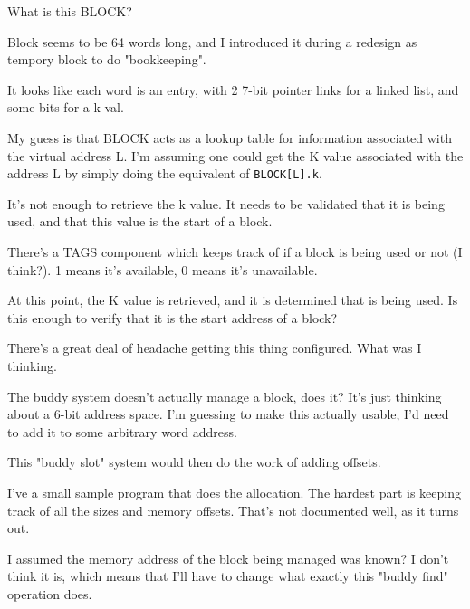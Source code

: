 What is this BLOCK?
\par

Block seems to be 64 words long, and I introduced it during a redesign as tempory block to do "bookkeeping".
\par

It looks like each word is an entry, with 2 7-bit pointer links for a linked list, and some bits for a k-val.
\par

My guess is that BLOCK acts as a lookup table for information associated with the virtual address L. I'm assuming one could get the K value associated with the address L by simply doing the equivalent of {\tt BLOCK[L].k}.
\par

It's not enough to retrieve the k value. It needs to be validated that it is being used, and that this value is the start of a block.
\par

There's a TAGS component which keeps track of if a block is being used or not (I think?). 1 means it's available, 0 means it's unavailable.
\par

At this point, the K value is retrieved, and it is determined that is being used. Is this enough to verify that it is the start address of a block?
\par

There's a great deal of headache getting this thing configured. What was I thinking.
\par

The buddy system doesn't actually manage a block, does it? It's just thinking about a 6-bit address space. I'm guessing to make this actually usable, I'd need to add it to some arbitrary word address.
\par

This "buddy slot" system would then do the work of adding offsets.
\par

I've a small sample program that does the allocation. The hardest part is keeping track of all the sizes and memory offsets. That's not documented well, as it turns out.
\par

I assumed the memory address of the block being managed was known? I don't think it is, which means that I'll have to change what exactly this "buddy find" operation does.
\par

